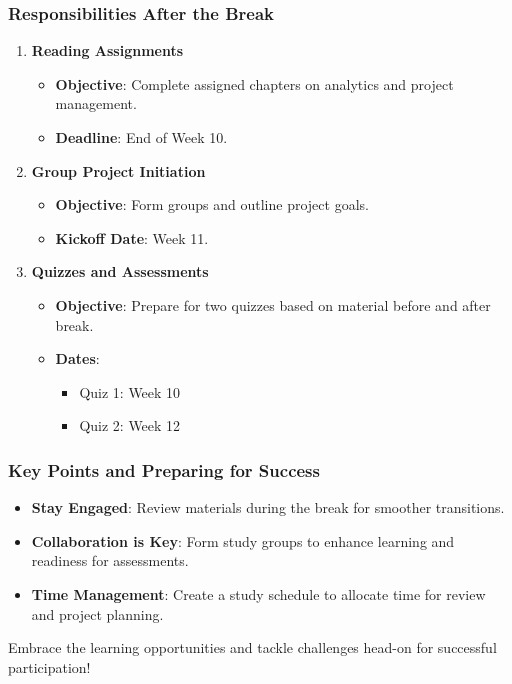 \documentclass[aspectratio=169]{beamer}
\begin{document}
\begin{frame}[fragile]
    \frametitle{Responsibilities After the Break}
    \begin{enumerate}
        \item \textbf{Reading Assignments}
        \begin{itemize}
            \item \textbf{Objective}: Complete assigned chapters on analytics and project management.
            \item \textbf{Deadline}: End of Week 10.
        \end{itemize}

        \item \textbf{Group Project Initiation}
        \begin{itemize}
            \item \textbf{Objective}: Form groups and outline project goals.
            \item \textbf{Kickoff Date}: Week 11.
        \end{itemize}

        \item \textbf{Quizzes and Assessments}
        \begin{itemize}
            \item \textbf{Objective}: Prepare for two quizzes based on material before and after break.
            \item \textbf{Dates}:
            \begin{itemize}
                \item Quiz 1: Week 10
                \item Quiz 2: Week 12
            \end{itemize}
        \end{itemize}
    \end{enumerate}
\end{frame}

\begin{frame}[fragile]
    \frametitle{Key Points and Preparing for Success}
    \begin{itemize}
        \item \textbf{Stay Engaged}: Review materials during the break for smoother transitions.
        \item \textbf{Collaboration is Key}: Form study groups to enhance learning and readiness for assessments.
        \item \textbf{Time Management}: Create a study schedule to allocate time for review and project planning.
    \end{itemize}
    
    Embrace the learning opportunities and tackle challenges head-on for successful participation!
\end{frame}
\end{document}
